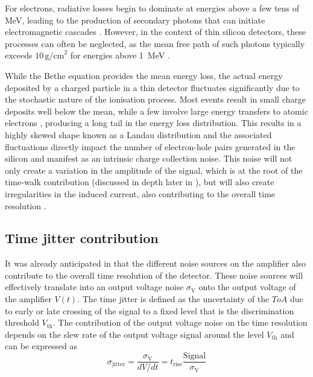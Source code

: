 		For electrons, radiative losses begin to dominate at energies above a few tens of MeV, leading to the production of secondary photons that can initiate electromagnetic cascades \cite{Paolozzi_thesis}. However, in the context of thin silicon detectors, these processes can often be neglected, as the mean free path of such photons typically exceeds $10\,\text{g/cm}^2$ for energies above \SI{1}{\mega\electronvolt} \cite{PDG}.

		While the Bethe equation provides the mean energy loss, the actual energy deposited by a charged particle in a thin detector fluctuates significantly due to the stochastic nature of the ionisation process. Most events result in small charge deposits well below the mean, while a few involve large energy transfers to atomic electrons , producing a long tail in the energy loss distribution. This results in a highly skewed shape known as a Landau distribution and the associated fluctuations directly impact the number of electron-hole pairs generated in the silicon and manifest as an intrinsic charge collection noise. This noise will not only create a variation in the amplitude of the signal, which is at the root of the time-walk contribution (discussed in depth later in ), but will also create irregularities in the induced current, also contributing to the overall time resolution \cite{timepix4}. 

		\subsection{Time jitter contribution}
		
		It was already anticipated in  that the different noise sources on the amplifier also contribute to the overall time resolution of the detector. These noise sources will effectively translate into an output voltage noise $\sigma_\text{V}$ onto the output voltage of the amplifier $V(t)$. The time jitter is defined as the uncertainty of the $ToA$ due to early or late crossing of the signal to a fixed level that is the discrimination threshold $V_{\text{th}}$. The contribution of the output voltage noise on the time resolution depends on the slew rate of the output voltage signal around the level $V_{\text{th}}$ and can be expressed as
		\begin{equation}
			\sigma_{\text{jitter}} = \frac{\sigma_{\text{V}}}{dV/dt} = t_{\text{rise}} \frac{\text{Signal}}{\sigma_{\text{V}}}
		\end{equation}  
		
